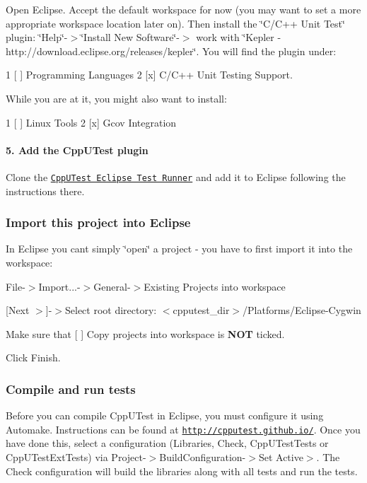 Open Eclipse. Accept the default workspace for now (you may want to set a more appropriate workspace location later on). Then install the \char`\"{}\+C/\+C++ Unit Test\char`\"{} plugin\+: \char`\"{}\+Help\char`\"{}-\/$>$\char`\"{}\+Install New Software\char`\"{}-\/$>$ work with \char`\"{}\+Kepler -\/ http\+://download.\+eclipse.\+org/releases/kepler\char`\"{}. You will find the plugin under\+: 
\begin{DoxyCode}
1 [ ] Programming Languages
2     [x] C/C++ Unit Testing Support.
\end{DoxyCode}
 While you are at it, you might also want to install\+: 
\begin{DoxyCode}
1 [ ] Linux Tools  
2     [x] Gcov Integration
\end{DoxyCode}


\paragraph*{5. Add the Cpp\+U\+Test plugin}

Clone the \href{https://github.com/tcmak/CppUTestEclipseJunoTestRunner}{\tt Cpp\+U\+Test Eclipse Test Runner} and add it to Eclipse following the instructions there.

\subsubsection*{Import this project into Eclipse}

In Eclipse you can\textquotesingle{}t simply \char`\"{}open\char`\"{} a project -\/ you have to first import it into the workspace\+:
\begin{DoxyItemize}
\item File-\/$>$Import...-\/$>$General-\/$>$Existing Projects into workspace
\item \mbox{[}Next $>$\mbox{]}-\/$>$Select root directory\+: {\ttfamily $<$cpputest\+\_\+dir$>$/\+Platforms/\+Eclipse-\/\+Cygwin}
\item Make sure that {\ttfamily \mbox{[} \mbox{]} Copy projects into workspace} is {\bfseries N\+OT} ticked.
\item Click Finish.
\end{DoxyItemize}

\subsubsection*{Compile and run tests}

Before you can compile Cpp\+U\+Test in Eclipse, you must configure it using Automake. Instructions can be found at \href{http://cpputest.github.io/}{\tt http\+://cpputest.\+github.\+io/}. Once you have done this, select a configuration (Libraries, Check, Cpp\+U\+Test\+Tests or Cpp\+U\+Test\+Ext\+Tests) via Project-\/$>$Build\+Configuration-\/$>$Set Active$>$. The \textquotesingle{}Check\textquotesingle{} configuration will build the libraries along with all tests and run the tests.

